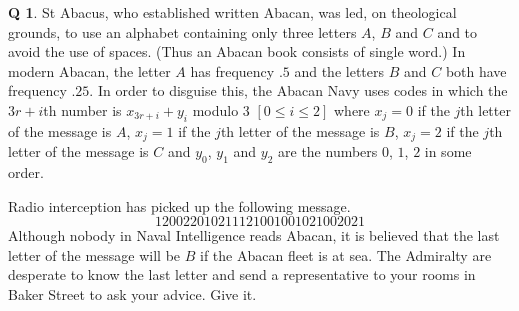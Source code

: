 \documentclass[12pt,a4paper]{article}
\theoremstyle{plain}
\theoremstyle{definition}
\newtheorem{question}[theorem]{Q}
\begin{document}
    \begin{question}
        \label{E;abacus}\label{C4.11}
        St Abacus, who established written Abacan,
        was led, on theological grounds, to use an alphabet containing
        only
        three letters $A$, $B$ and $C$ and to avoid the use of
        spaces. (Thus an Abacan book consists of single word.)
        In modern Abacan, the letter
        $A$ has frequency $.5$ and the letters $B$ and $C$ both
        have frequency $.25$. In order to disguise this,
        the Abacan Navy uses codes in which the
        $3r+i$th number is $x_{3r+i}+y_{i}$ modulo $3$ $[0\leq i\leq 2]$
        where $x_{j}=0$ if the $j$th letter of the message is $A$,
        $x_{j}=1$ if the $j$th letter of the message is $B$,
        $x_{j}=2$ if the $j$th letter of the message is $C$
        and $y_{0}$, $y_{1}$ and $y_{2}$ are the numbers $0$, $1$, $2$
        in some order.

        Radio interception has picked up the following message.
        \[120022010211121001001021002021\]
        Although nobody in Naval Intelligence reads Abacan,
        it is believed that the last letter of the message will
        be $B$ if the Abacan fleet is at sea.
        The Admiralty are desperate to know the last letter
        and send a representative to your rooms
        in Baker Street to ask your advice. Give it.
    \end{question}
\end{document}

